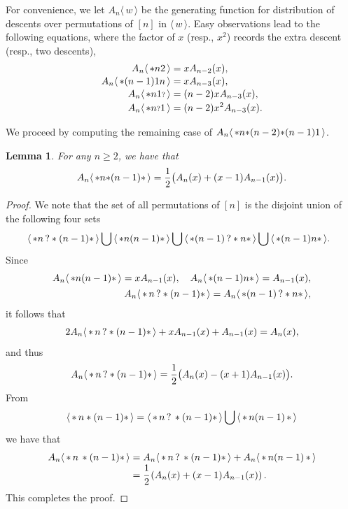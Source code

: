 \documentclass[11pt]{article}
\newtheorem{lem}[thm]{Lemma}
\newcommand{\st}{\mbox{\ensuremath{\ast}}}
\newcommand{\q}{\mbox{\ensuremath{\scriptstyle{?}}}}
\newcommand{\+}{\mbox{\ensuremath{\scriptstyle{+}}}}
\newcommand{\glob}[1]{\ensuremath{\langle\, #1\,\rangle}}
\begin{document}
For convenience, we let $A_n \glob{w}$ be the  generating function for distribution of descents over  permutations of $[n]$ in $\glob{w}$.
Easy observations lead to the following equations, where the factor of $x$ (resp., $x^2$) records the extra descent (resp., two descents),
\begin{align*}
	A_n \glob{\st n2}     & = x A_{n-2}(x),         \\[-2pt]
	A_n \glob{\st(n-1)1n} & =  x A_{n-3}(x),        \\[-2pt]
	A_n \glob{\st n1\q}   & = (n-2) x A_{n-3}(x),   \\[-2pt]
	A_n \glob{\st n\q 1}  & = (n-2) x^2 A_{n-3}(x).
\end{align*}

We proceed by computing  the remaining case of $A_n \glob{\st n\st (n-2)\st (n-1)1}$.
\begin{lem}\label{lem-1}
	For any $n\ge 2$, we have  that
	$$A_n \glob{\st n\st (n-1)\st }
		= \frac{1}{2}\big( A_{n}(x) + (x-1) A_{n-1}(x) \big).$$
\end{lem}

\begin{proof}
	We note that the set of all permutations of $[n]$ is the disjoint union of the following four  sets
	\begin{align*}
		 & \ \glob{\st n \, ? *  (n-1)\st}   \bigcup \,    \glob{\st n  (n-1)\st} \bigcup \,  \glob{\st (n-1) \, ? * n \st}  \bigcup \,   \glob{\st (n-1) n \st}.
	\end{align*}
	Since
	\begin{align*}
		A_n \glob{\st n  (n-1)\st} =  x A_{n-1}(x), \quad
		A_n \glob{\st  (n-1) n \st} =   A_{n-1}(x), \\[1pt]
		A_n \glob{\st \, n \, ? *  (n-1)\st}   = A_n \glob{\st (n-1) \, ? * n \st},
	\end{align*}
	it follows that
	\begin{align*}
		2 A_n \glob{\st\, n \, ? *  (n-1)\st}  +  x A_{n-1}(x) + A_{n-1}(x)  = A_{n}(x),
	\end{align*}
	and thus
	\begin{align*}
		A_n \glob{\st\, n \, ? *  (n-1)\st}   = \frac{1}{2} \big(A_{n}(x)-(x+1)A_{n-1}(x)\big).
	\end{align*}
	From
	\begin{align*}
		\glob{\st\,  n *  (n-1)\st}    =  \glob{\st \,  n \, ? \, *  (n-1)\st} \bigcup \,  \glob{\st \, n  (n-1)\, \st}
	\end{align*}
	we have that
	\begin{align*}
		A_n \glob{\st\,  n \, *  (n-1)\st} & =  A_n \glob{\st \, n \, ? \, *  (n-1)\st}  + A_n \glob{\st\,  n  (n-1)\, \st} \\[-5pt]
		                                   & = \cfrac{1}{2}  \left( A_{n}(x) + (x-1) A_{n-1}(x) \right).
	\end{align*}
	This completes the proof.
\end{proof}
\end{document}
